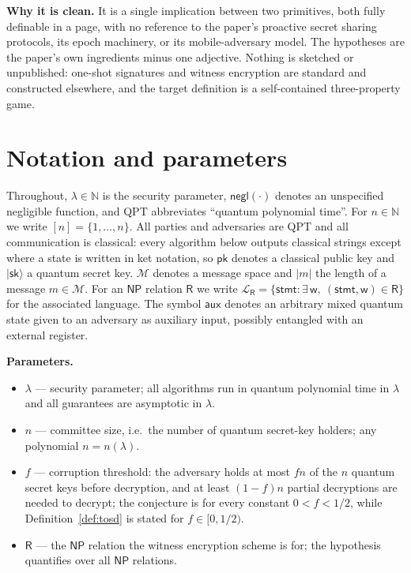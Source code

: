 \documentclass{aicr-conjecture}
\newcommand{\ket}[1]{\lvert #1 \rangle}
\newcommand{\negl}{\mathsf{negl}}
\newcommand{\NP}{\mathsf{NP}}
\newcommand{\Rel}{\mathsf{R}}
\newcommand{\Msp}{\mathcal{M}}
\newcommand{\Lang}{\mathcal{L}}
\newcommand{\pk}{\mathsf{pk}}
\newcommand{\sk}{\mathsf{sk}}
\newcommand{\stmt}{\mathsf{stmt}}
\newcommand{\wit}{\mathsf{w}}
\newcommand{\aux}{\mathsf{aux}}
\begin{document}
\textbf{Why it is clean.} It is a single implication between two
primitives, both fully definable in a page, with no reference to the
paper's proactive secret sharing protocols, its epoch machinery, or
its mobile-adversary model. The hypotheses are the paper's own
ingredients minus one adjective. Nothing is sketched or unpublished:
one-shot signatures and witness encryption are standard and
constructed elsewhere, and the target definition is a self-contained
three-property game.

\section{Notation and parameters}\label{sec:notation}

Throughout, $\lambda \in \mathbb{N}$ is the security parameter,
$\negl(\cdot)$ denotes an unspecified negligible function, and QPT
abbreviates ``quantum polynomial time''. For $n \in \mathbb{N}$ we
write $[n] = \{1, \dots, n\}$. All parties and adversaries are QPT and
all communication is classical: every algorithm below outputs
classical strings except where a state is written in ket notation, so
$\pk$ denotes a classical public key and $\ket{\sk}$ a quantum secret
key. $\Msp$ denotes a message space and $\lvert m \rvert$ the length
of a message $m \in \Msp$. For an $\NP$ relation $\Rel$ we write
$\Lang_{\Rel} = \{\stmt : \exists\, \wit,\ (\stmt, \wit) \in \Rel\}$
for the associated language. The symbol $\aux$ denotes an arbitrary
mixed quantum state given to an adversary as auxiliary input, possibly
entangled with an external register.

\textbf{Parameters.}
\begin{itemize}[leftmargin=1.2em]
\item $\lambda$ --- security parameter; all algorithms run in quantum
  polynomial time in $\lambda$ and all guarantees are asymptotic in
  $\lambda$.
\item $n$ --- committee size, i.e.\ the number of quantum secret-key
  holders; any polynomial $n = n(\lambda)$.
\item $f$ --- corruption threshold: the adversary holds at most $fn$
  of the $n$ quantum secret keys before decryption, and at least
  $(1-f)n$ partial decryptions are needed to decrypt; the conjecture
  is for every constant $0 < f < 1/2$, while
  Definition~\ref{def:tosd} is stated for $f \in [0, 1/2)$.
\item $\Rel$ --- the $\NP$ relation the witness encryption scheme is
  for; the hypothesis quantifies over all $\NP$ relations.
\end{itemize}
\end{document}
